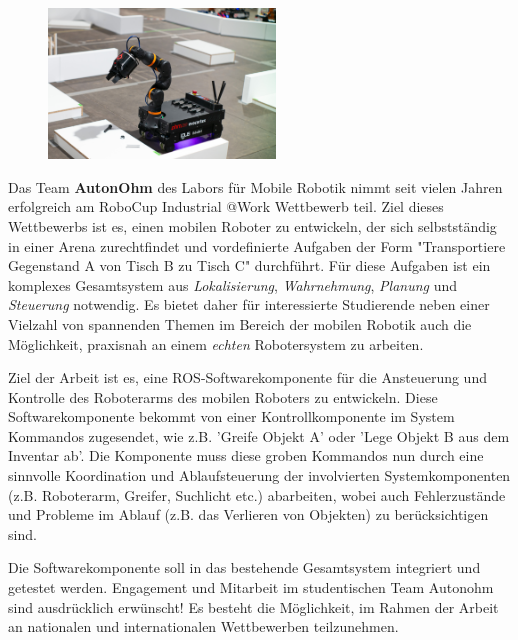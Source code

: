 \documentclass{ohm_project_description}
\begin{document}
\maketitle
\thispagestyle{fancy}

\vspace*{-2.5cm}
\begin{figure}[h!]
    \centering
    \includegraphics[height=4cm]{img/atwork.jpg}
\end{figure} 


Das Team \textbf{AutonOhm} des Labors für Mobile Robotik nimmt seit vielen Jahren erfolgreich am RoboCup Industrial @Work Wettbewerb teil. Ziel dieses Wettbewerbs ist es, einen mobilen Roboter zu entwickeln, der sich selbstständig in einer Arena zurechtfindet und vordefinierte Aufgaben der Form "Transportiere Gegenstand A von Tisch B zu Tisch C" durchführt. Für diese Aufgaben ist ein komplexes Gesamtsystem aus \emph{Lokalisierung}, \emph{Wahrnehmung}, \emph{Planung} und \emph{Steuerung} notwendig. Es bietet daher für interessierte Studierende neben einer Vielzahl von spannenden Themen im Bereich der mobilen Robotik auch die Möglichkeit, praxisnah an einem \emph{echten} Robotersystem zu arbeiten.

Ziel der Arbeit ist es, eine ROS-Softwarekomponente für die Ansteuerung und Kontrolle des Roboterarms des mobilen Roboters zu entwickeln. Diese Softwarekomponente bekommt von einer Kontrollkomponente im System Kommandos zugesendet, wie z.B. 'Greife Objekt A' oder 'Lege Objekt B aus dem Inventar ab'. Die Komponente muss diese groben Kommandos nun durch eine sinnvolle Koordination und Ablaufsteuerung der involvierten  Systemkomponenten (z.B. Roboterarm, Greifer, Suchlicht etc.) abarbeiten, wobei auch Fehlerzustände und Probleme im Ablauf (z.B. das Verlieren von Objekten) zu berücksichtigen sind.

Die Softwarekomponente soll in das bestehende Gesamtsystem integriert und getestet werden. Engagement und Mitarbeit im studentischen Team Autonohm sind ausdrücklich erwünscht! Es besteht die Möglichkeit, im Rahmen der Arbeit an nationalen und internationalen Wettbewerben teilzunehmen.
\end{document}

